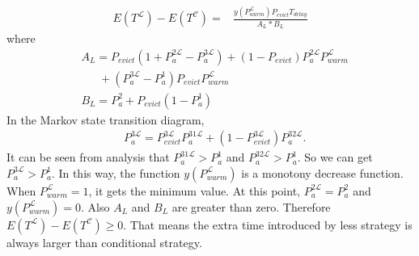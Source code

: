\begin{equation}
\label{equ:detail1}
\begin{split}
E(T^{\mathcal{L}}) - E(T^{\mathcal{C}}) = &\frac{y(P_{warm}^{\mathcal{L}})P_{evict}T_{delay}}{A_{L}*B_{L}}
\end{split}\end{equation}
where
\begin{equation*}
\begin{split}
&A_{L}=P_{evict}(1+P_{a}^{\mathfrak{2}\mathcal{L}}-P_{a}^{\mathfrak{3}\mathcal{L}})+(1-P_{evict})P_{a}^{\mathfrak{2}\mathcal{L}}P_{warm}^{\mathcal{L}}  \\
&\ \ \ \ \ \ \ +(P_{a}^{\mathfrak{3}\mathcal{L}}-P_{a}^{\mathfrak{1}})P_{evict}P_{warm}^{\mathcal{L}} \\
&B_{L}=P_{a}^{\mathfrak{2}}+P_{evict}(1-P_{a}^{\mathfrak{1}})
\end{split}\end{equation*}
In the Markov state transition diagram,
\begin{equation*}
\begin{split}
&P_{a}^{\mathfrak{3}\mathcal{L}}=P_{evict}^{\mathfrak{3}\mathcal{L}}P_{a}^{\mathfrak{31}\mathcal{L}}+(1-P_{evict}^{\mathfrak{3}\mathcal{L}})P_{a}^{\mathfrak{32}\mathcal{L}} .
\end{split}\end{equation*}
It can be seen from analysis that $P_{a}^{\mathfrak{31}\mathcal{L}} > P_{a}^{\mathfrak{1}}$ and $P_{a}^{\mathfrak{32}\mathcal{L}} > P_{a}^{\mathfrak{1}}$.
So we can get $P_{a}^{\mathfrak{3}\mathcal{L}} > P_{a}^{\mathfrak{1}}$.
In this way,
the function $y(P_{warm}^{\mathcal{L}})$ is a monotony decrease function. When $P_{warm}^{\mathcal{L}} = 1$, it gets the minimum value.
At this point, $P_{a}^{\mathfrak{2}\mathcal{L}} = P_{a}^{\mathfrak{2}}$ and $y(P_{warm}^{\mathcal{L}}) = 0$.
Also $A_{L}$ and $B_{L}$ are greater than zero.
Therefore $E(T^{\mathcal{L}}) - E(T^{\mathcal{C}})\geq 0$.
That means the extra time introduced by less {\vwarm} strategy is always larger than conditional {\vwarm} strategy.

